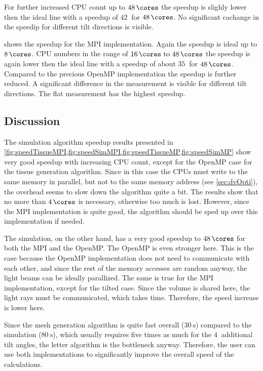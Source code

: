For further increased \ac{CPU} count up to $\SI{48}{\cores}$ the speedup is slighly lower then the ideal line with a speedup of $\SI{42}{}$ for $\SI{48}{\cores}$.
No significant cachange in the speedip for different tilt directions is visible.
\par
% 
 shows the speedup for the \ac{MPI} implementation.
Again the speedup is ideal up to $\SI{8}{\cores}$.
\ac{CPU} numbers in the range of $\SIrange{16}{48}{\cores}$ the speedup is again lower then the ideal line with a speedup of about $\SI{35}{}$ for $\SI{48}{\cores}$.
Compared to the precious \ac{OpenMP} implementation the speedup is further reduced.
A significant difference in the measurement is visible for different tilt directions.
The flat measurement has the highest speedup.
%
%
%
\subsection{Discussion}
%
The simulation algorithm speedup results presented in \cref{fig:speedTissueMPI,fig:speedSimMPI,fig:speedTissueMP,fig:speedSimMP} show very good speedup with increasing \ac{CPU} count, except for the \ac{OpenMP} case for the tissue generation algorithm.
Since in this case the \acsp{CPU} must write to the same memory in parallel, but not to the same memory address (see \cref{sec:dvOpti}), the overhead seems to slow down the algorithm quite a bit.
The results show that no more than $\SI{4}{\cores}$ is necessary, otherwise too much \dummy{} is lost.
However, since the \ac{MPI} implementation is quite good, the algorithm should be sped up over this implementation if needed.
\par
%
The simulation, on the other hand, has a very good speedup to $\SI{48}{\cores}$ for both the \ac{MPI} and the \ac{OpenMP}.
The \ac{OpenMP} is even stronger here.
This is the case because the \ac{OpenMP} implementation does not need to communicate with each other, and since the rest of the memory accesses are random anyway, the light beams can be ideally parallized.
The same is true for the \ac{MPI} implementation, except for the tilted case.
Since the volume is shared here, the light rays must be communicated, which takes time.
Therefore, the speed increase is lower here.
\par
%
Since the mesh generation algorithm is quite fast overall ($\SI{30}{\second}$) compared to the simulation ($\SI{80}{\second}$), which usually requires five times as much for the $\SI{4}{}$ additional tilt angles, the letter algorithm is the bottleneck anyway.
Therefore, the user can use both implementations to significantly improve the overall speed of the calculations.
